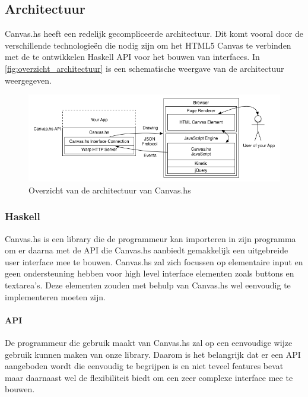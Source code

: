 \subsection{Architectuur}
Canvas.hs heeft een redelijk gecompliceerde architectuur. Dit komt vooral door de verschillende technologieën die nodig zijn om het HTML5 Canvas te verbinden met de te ontwikkelen Haskell API voor het bouwen van interfaces. In \autoref{fig:overzicht_architectuur} is een schematische weergave van de architectuur weergegeven.

\begin{figure}
\begin{center}
\includegraphics[keepaspectratio,width=\textwidth]{./Hoofdstukken/architecture.png}
\caption{Overzicht van de architectuur van Canvas.hs}
\label{fig:overzicht_architectuur}
\end{center}
\end{figure}

\subsubsection{Haskell}
Canvas.hs is een library die de programmeur kan importeren in zijn programma om er daarna met de API die Canvas.hs aanbiedt gemakkelijk een uitgebreide user interface mee te bouwen. Canvas.hs zal zich focussen op elementaire input en geen ondersteuning hebben voor high level interface elementen zoals buttons en textarea's. Deze elementen zouden met behulp van Canvas.hs wel eenvoudig te implementeren moeten zijn.

\paragraph{API}
De programmeur die gebruik maakt van Canvas.hs zal op een eenvoudige wijze gebruik kunnen maken van onze library. Daarom is het belangrijk dat er een API aangeboden wordt die eenvoudig te begrijpen is en niet teveel features bevat maar daarnaast wel de flexibiliteit biedt om een zeer complexe interface mee te bouwen.

